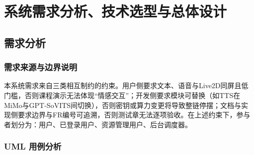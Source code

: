 \documentclass{base}
\begin{document}
\chapter{系统需求分析、技术选型与总体设计}

\section{需求分析}

\subsection{需求来源与边界说明}

本系统需求来自三类相互制约的约束。用户侧要求文本、语音与Live2D同屏且低门槛，否则课程演示无法体现``情感交互''；开发侧要求模块可替换（如TTS在MiMo与GPT-SoVITS间切换），否则密钥或算力变更将导致整链停摆；文档与实现侧要求边界与FR编号可追溯，否则测试章无法逐项验收。在上述约束下，参与者划分为：用户、已登录用户、资源管理用户、后台调度器。

\subsection{UML 用例分析}
\end{document}
